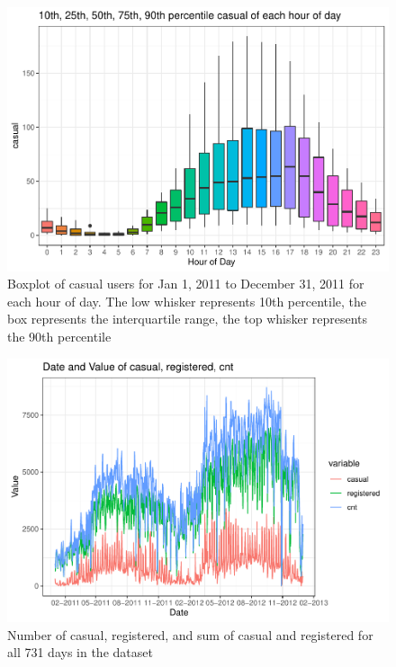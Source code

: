 \documentclass[
]{article}
\begin{document}
\begin{figure}
\centering
\includegraphics{LeastSquares_files/figure-latex/unnamed-chunk-2-1.pdf}
\caption{Boxplot of casual users for Jan 1, 2011 to December 31, 2011
for each hour of day. The low whisker represents 10th percentile, the
box represents the interquartile range, the top whisker represents the
90th percentile}
\end{figure}

\begin{figure}
\centering
\includegraphics{LeastSquares_files/figure-latex/unnamed-chunk-3-1.pdf}
\caption{Number of casual, registered, and sum of casual and registered
for all 731 days in the dataset}
\end{figure}
\end{document}
